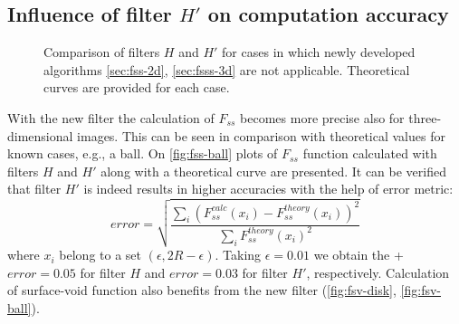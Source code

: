 \documentclass[preprint]{elsarticle}
\begin{document}
\subsection{Influence of filter $H'$ on computation accuracy}

\begin{figure}
  \centering
  \hfill
  \hfill
  \caption[]{Comparison of filters $H$ and $H'$ for cases in which newly
    developed algorithms \cref{sec:fss-2d}, \cref{sec:fsss-3d} are not
    applicable. Theoretical curves are provided for each case.}
  \label{fig:not-covered}
\end{figure}
With the new filter the calculation of $F_{ss}$ becomes more precise also for
three-dimensional images. This can be seen in comparison with theoretical values
for known cases, e.g., a ball. On \cref{fig:fss-ball} plots
of $F_{ss}$ function calculated with filters $H$ and $H'$ along with a
theoretical curve are presented. It can be verified that filter $H'$ is indeed results 
in higher accuracies with the help of error metric:
\begin{equation}
  error = \sqrt{\frac{\sum_i (F_{ss}^{calc}(x_i) -
      F_{ss}^{theory}(x_i))^2}{\sum_i F_{ss}^{theory}(x_i)^2}}
  \label{eq:error}
\end{equation}
where $x_i$ belong to a set $(\epsilon, 2R - \epsilon)$. Taking
$\epsilon = 0.01$ we obtain the +$error = 0.05$ for filter $H$ and $error = 0.03$ for
filter $H'$, respectively. Calculation of surface-void function also benefits from the new
filter (\cref{fig:fsv-disk}, \cref{fig:fsv-ball}).
\end{document}
